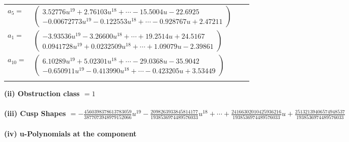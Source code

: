 \documentclass[1p]{elsarticle_modified}
\theoremstyle{definition}
\begin{document}
\begin{tabular}{m{7pt} m{180pt} m{7pt} m{180pt} }
\flushright $a_{5}=$&$\begin{pmatrix}3.52776 u^{19}+2.76103 u^{18}+\cdots-15.5004 u-22.6925\\-0.00672773 u^{19}-0.122553 u^{18}+\cdots-0.928767 u+2.47211\end{pmatrix}$ \\
\flushright $a_{1}=$&$\begin{pmatrix}-3.93536 u^{19}-3.26600 u^{18}+\cdots+19.2514 u+24.5167\\0.0941728 u^{19}+0.0232509 u^{18}+\cdots+1.09079 u-2.39861\end{pmatrix}$ \\
\flushright $a_{10}=$&$\begin{pmatrix}6.10289 u^{19}+5.02301 u^{18}+\cdots-29.0368 u-35.9042\\-0.650911 u^{19}-0.413990 u^{18}+\cdots-0.423205 u+3.53449\end{pmatrix}$\\&\end{tabular}
\flushleft \textbf{(ii) Obstruction class $= 1$}\\~\\
\flushleft \textbf{(iii) Cusp Shapes $= -\frac{4560398378613783059}{3877073948979152066} u^{19}-\frac{2098263933845814177}{1938536974489576033} u^{18}+\cdots+\frac{24166302010425936216}{1938536974489576033} u+\frac{25132139406574948537}{1938536974489576033}$}\\~\\
\newpage\renewcommand{\arraystretch}{1}
\flushleft \textbf{(iv) u-Polynomials at the component}\newline \\
\end{document}

